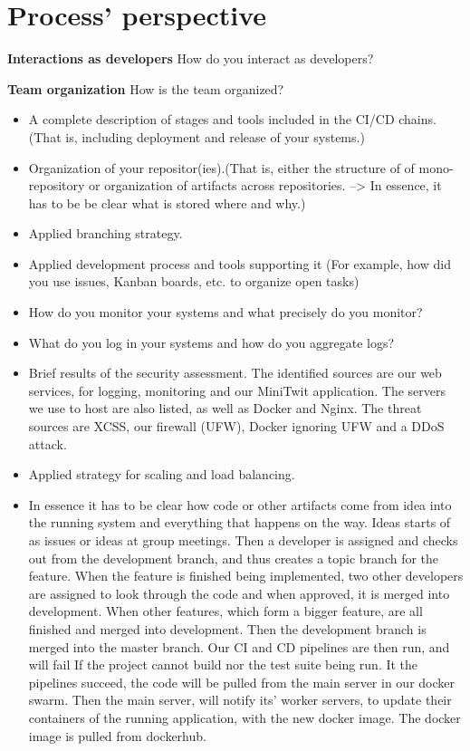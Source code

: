 \section{Process' perspective}

\textbf{Interactions as developers}\newline
 How do you interact as developers?\newline
 
\newline
\textbf{Team organization}\newline
  How is the team organized?\newline
  \begin{itemize}
  \item A complete description of stages and tools included in the CI/CD chains.(That is, including deployment and release of your systems.)
  \item Organization of your repositor(ies).(That is, either the structure of of mono-repository or organization of artifacts across repositories. --> In essence, it has to be be clear what is stored where and why.)
  \item Applied branching strategy.
  \item Applied development process and tools supporting it (For example, how did you use issues, Kanban boards, etc. to organize open tasks)
  \item How do you monitor your systems and what precisely do you monitor?
  \item What do you log in your systems and how do you aggregate logs?
  \item Brief results of the security assessment.
        The identified sources are our web services, for logging, monitoring and our MiniTwit application.
        The servers we use to host are also listed, as well as Docker and Nginx.
        The threat sources are XCSS, our firewall (UFW), Docker ignoring UFW and a DDoS attack.
        
  \item Applied strategy for scaling and load balancing.
  \item In essence it has to be clear how code or other artifacts come from idea into the running system and everything that happens on the way.
        Ideas starts of as issues or ideas at group meetings.
        Then a developer is assigned and checks out from the development branch,
        and thus creates a topic branch for the feature.
        When the feature is finished being implemented, 
        two other developers are assigned to look through
        the code and when approved, it is merged into development.
        When other features, which form a bigger feature, are all finished and merged into development.
        Then the development branch is merged into the master branch.
        Our CI and CD pipelines are then run, and will fail 
        If the project cannot build nor the test suite being run.
        It the pipelines succeed, the code will be pulled from 
        the main server in our docker swarm.
        Then the main server, will notify its' worker servers,
        to update their containers of the running application,
        with the new docker image. The docker image is pulled from dockerhub.
        
  
\end{itemize}